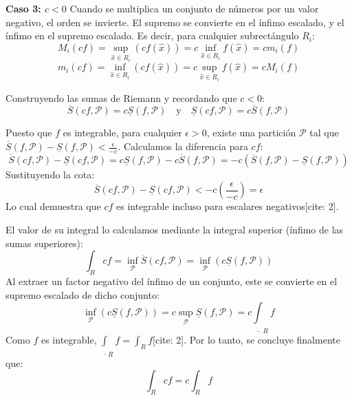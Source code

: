\documentclass[11pt,letterpaper]{article}
\begin{document}
\textbf{Caso 3: $c < 0$}
Cuando se multiplica un conjunto de números por un valor negativo, el orden se invierte. El supremo se convierte en el ínfimo escalado, y el ínfimo en el supremo escalado. Es decir, para cualquier subrectángulo $R_{i}$:
\begin{equation*}
M_{i}(cf) = \sup_{\hat{x} \in R_{i}} (c f(\hat{x})) = c \inf_{\hat{x} \in R_{i}} f(\hat{x}) = c m_{i}(f)
\end{equation*}
\begin{equation*}
m_{i}(cf) = \inf_{\hat{x} \in R_{i}} (c f(\hat{x})) = c \sup_{\hat{x} \in R_{i}} f(\hat{x}) = c M_{i}(f)
\end{equation*}

Construyendo las sumas de Riemann y recordando que $c < 0$:
\begin{equation*}
\overline{S}(cf,\mathcal{P}) = c \underline{S}(f,\mathcal{P}) \quad \text{y} \quad \underline{S}(cf,\mathcal{P}) = c \overline{S}(f,\mathcal{P})
\end{equation*}

Puesto que $f$ es integrable, para cualquier $\epsilon > 0$, existe una partición $\mathcal{P}$ tal que $\overline{S}(f,\mathcal{P}) - \underline{S}(f,\mathcal{P}) < \frac{\epsilon}{-c}$. 
Calculamos la diferencia para $cf$:
\begin{equation*}
\overline{S}(cf,\mathcal{P}) - \underline{S}(cf,\mathcal{P}) = c \underline{S}(f,\mathcal{P}) - c \overline{S}(f,\mathcal{P}) = -c (\overline{S}(f,\mathcal{P}) - \underline{S}(f,\mathcal{P}))
\end{equation*}
Sustituyendo la cota:
\begin{equation*}
\overline{S}(cf,\mathcal{P}) - \underline{S}(cf,\mathcal{P}) < -c \left(\frac{\epsilon}{-c}\right) = \epsilon
\end{equation*}
Lo cual demuestra que $cf$ es integrable incluso para escalares negativos[cite: 2].

El valor de su integral lo calculamos mediante la integral superior (ínfimo de las sumas superiores):
\begin{equation*}
\int_{R}cf = \inf_{\mathcal{P}} \overline{S}(cf,\mathcal{P}) = \inf_{\mathcal{P}} (c \underline{S}(f,\mathcal{P}))
\end{equation*}
Al extraer un factor negativo del ínfimo de un conjunto, este se convierte en el supremo escalado de dicho conjunto:
\begin{equation*}
\inf_{\mathcal{P}} (c \underline{S}(f,\mathcal{P})) = c \sup_{\mathcal{P}} \underline{S}(f,\mathcal{P}) = c \underline{\int}_{R}f
\end{equation*}
Como $f$ es integrable, $\underline{\int}_{R}f = \int_{R}f$[cite: 2]. Por lo tanto, se concluye finalmente que:
\begin{equation*}
\int_{R}cf = c \int_{R}f
\end{equation*}
\end{document}
